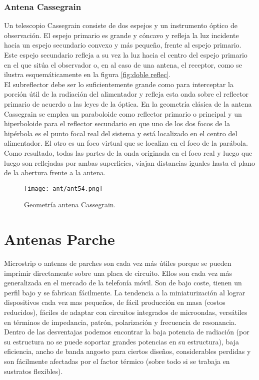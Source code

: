 \documentclass[
	12pt, %
	fleqn, %
	a4paper, %
	oneside, %
]{LegrandOrangeBook}
\begin{document}
\subsubsection{Antena Cassegrain}
Un telescopio Cassegrain consiste de dos espejos y un instrumento óptico de observación. El espejo primario es grande y cóncavo y refleja la luz incidente hacia un espejo secundario convexo y más pequeño, frente al espejo primario. Este espejo secundario refleja a su vez la luz hacia el centro del espejo primario en el que sitúa el observador o, en al caso de una antena, el receptor, como se ilustra esquemáticamente en la figura \ref{fig:doble reflec}.\\
El subreflector debe ser lo suficientemente grande como para interceptar la porción útil de la radiación del alimentador y refleja esta onda sobre el reflector primario de acuerdo a las leyes de la óptica. En la geometría clásica de la antena Cassegrain se emplea un paraboloide como reflector primario o principal y un hiperboloide para el reflector secundario en que uno de los dos focos de la hipérbola es el punto focal real del sistema y está localizado en el centro del alimentador. El otro es un foco virtual que se localiza en el foco de la parábola. Como resultado, todas las partes de la onda originada en el foco real y luego que luego son reflejadas por ambas superficies, viajan distancias iguales hasta el plano de la abertura frente a la antena.
\begin{figure}[H]
\centering
\texttt{[image: ant/ant54.png]}
\caption{Geometría antena Cassegrain.}
\end{figure}
\section{Antenas Parche}
Microstrip o antenas de parches son cada vez más útiles porque se pueden imprimir directamente sobre una placa de circuito. Ellos son cada vez más generalizada en el mercado de la telefonía móvil. Son de bajo coste, tienen un perfil bajo y se fabrican fácilmente. La tendencia a la miniaturización al lograr dispositivos cada vez mas pequeños, de fácil producción en masa (costos reducidos), fáciles de adaptar con circuitos integrados de microondas, versátiles en términos de impedancia, patrón, polarización y frecuencia de resonancia. Dentro de las desventajas podemos encontrar la baja potencia de radiación (por su estructura no se puede soportar grandes potencias en su estructura), baja eficiencia, ancho de banda angosto para ciertos diseños, considerables perdidas y son fácilmente afectadas por el factor térmico (sobre todo si se trabaja en sustratos flexibles).
\end{document}
